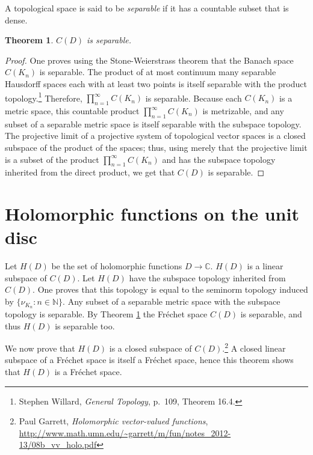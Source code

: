 \documentclass{article}
\newtheorem{theorem}{Theorem}
\begin{document}
A topological space is said to be {\em separable} if it has a countable subset that is dense.

\begin{theorem}
$C(D)$ is separable.
\label{separable}
\end{theorem}
\begin{proof}
One proves using the Stone-Weierstrass theorem that the Banach
space $C(K_n)$ is separable.
The product of at most continuum many separable Hausdorff spaces each with at least two points is itself  separable
 with the product topology.\footnote{Stephen Willard, {\em General Topology}, p.~109, Theorem 16.4.} Therefore, $\prod_{n=1}^\infty C(K_n)$ is separable. 
Because each $C(K_n)$ is a metric space, this countable product $\prod_{n=1}^\infty C(K_n)$ is metrizable, and any subset of a separable metric space is itself separable with the subspace
topology.
The projective limit of a projective system of topological vector spaces is a closed subspace
of the product of the spaces; thus, using merely that the projective limit is a subset of the product $\prod_{n=1}^\infty C(K_n)$ and has the subspace topology inherited from the direct
product, 
we get that $C(D)$ is separable.
\end{proof}





\section{Holomorphic functions on the unit disc}
Let $H(D)$ be the set of holomorphic functions $D \to \mathbb{C}$. $H(D)$ is a linear subspace of $C(D)$. 
Let $H(D)$ have the subspace topology inherited from $C(D)$. One proves that this topology is equal to the seminorm topology induced 
by $\{\nu_{K_n}: n \in \mathbb{N}\}$.  Any subset of a separable metric space with the subspace topology is separable. By Theorem \ref{separable} the Fr\'echet space
$C(D)$ is separable, and thus $H(D)$ is separable too.

We now prove that $H(D)$ is a closed subspace of $C(D)$.\footnote{Paul Garrett, {\em Holomorphic vector-valued functions}, \url{http://www.math.umn.edu/~garrett/m/fun/notes_2012-13/08b_vv_holo.pdf}} A closed linear subspace of a Fr\'echet space is itself a Fr\'echet space, hence this theorem shows that $H(D)$ is a Fr\'echet space.
\end{document}
